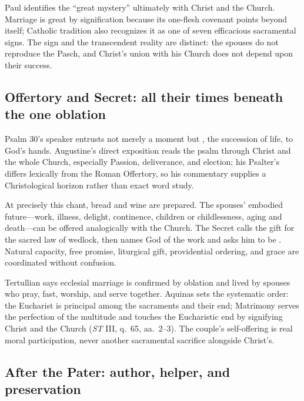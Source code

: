 \begin{sourcecard}{}
Paul identifies the ``great mystery'' ultimately with Christ and the Church. Marriage is great by signification because its one-flesh covenant points beyond itself; Catholic tradition also recognizes it as one of seven efficacious sacramental signs. The sign and the transcendent reality are distinct: the spouses do not reproduce the Pasch, and Christ's union with his Church does not depend upon their success.
\end{sourcecard}

\sectionguard
\subsection*{Offertory and Secret: all their times beneath the one oblation\enspace{}}

Psalm 30's speaker entrusts not merely a moment but , the succession of life, to God's hands. Augustine's direct exposition reads the psalm through Christ and the whole Church, especially Passion, deliverance, and election; his Psalter's  differs lexically from the Roman Offertory, so his commentary supplies a Christological horizon rather than exact word study.

At precisely this chant, bread and wine are prepared. The spouses' embodied future---work, illness, delight, continence, children or childlessness, aging and death---can be offered analogically with the Church. The Secret calls the gift  for the sacred law of wedlock, then names God  of the work and asks him to be . Natural capacity, free promise, liturgical gift, providential ordering, and grace are coordinated without confusion.

Tertullian says ecclesial marriage is confirmed by oblation and lived by spouses who pray, fast, worship, and serve together. Aquinas sets the systematic order: the Eucharist is principal among the sacraments and their end; Matrimony serves the perfection of the multitude and touches the Eucharistic end by signifying Christ and the Church (\emph{ST} III, q.~65, aa.~2--3). The couple's self-offering is real moral participation, never another sacramental sacrifice alongside Christ's.

\sectionguard
\subsection*{After the Pater: author, helper, and preservation\enspace{}}

